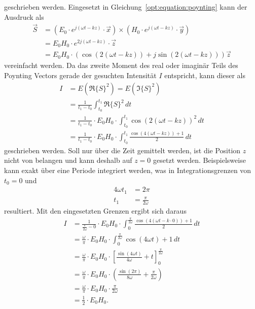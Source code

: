 geschrieben werden.
Eingesetzt in Gleichung~\ref{opt:equation:poynting} kann der Ausdruck als
\begin{align}
\vec{S}
&=
\left(E_0 \cdot e^{j(\omega t-k z)} \cdot \vec{x}\right) \times \left(H_0 \cdot e^{j(\omega t-k z)} \cdot \vec{y}\right)
\\
&=
E_0 H_0 \cdot e^{2j(\omega t-k z)} \cdot \vec{z}
\\
&=
E_0 H_0 \cdot \left(\cos{(2(\omega t-kz))}+j\sin{(2(\omega t-kz))}\right) \vec{z}
\end{align}
vereinfacht werden.
Da das zweite Moment des real oder imaginär Teils des Poynting Vectors gerade der gesuchten Intensität $I$ entspricht, kann dieser als 
\begin{align}
I
&=
E(\Re\{S\}^2)
=
E(\Im\{S\}^2)
\\
&=
\frac{1}{t_1- t_0} \int_{t_0}^{t_1} \Re\{S\}^2 \,dt
\\
&=
\frac{1}{t_1 - t_0} \cdot E_0 H_0 \cdot \int_{t_0}^{t_1}\cos\left({2(\omega t-kz)}\right)^2 \,dt
\\
&=
\frac{1}{t_1 - t_0} \cdot E_0 H_0 \cdot \int_{t_0}^{t_1}\frac{\cos(4(\omega t-kz)) + 1}{2} \,dt
\end{align}
geschrieben werden.
Soll nur über die Zeit gemittelt werden, ist die Position $z$ nicht von belangen und kann deshalb auf $z=0$ gesetzt werden.
Beispielsweise kann exakt über eine Periode integriert werden, was in Integrationsgrenzen von $t_0=0$ und
\begin{align}
4\omega t_1
&=
2\pi
\\
t_1
&=
\frac{\pi}{2\omega}
\end{align}
resultiert.
Mit den eingesetzten Grenzen ergibt sich daraus
\begin{align}
I
&=
\frac{1}{\frac{\pi}{2\omega} - 0} \cdot E_0 H_0 \cdot \int_{0}^{\frac{\pi}{2\omega}}\frac{\cos(4(\omega t-k\cdot0)) + 1}{2} \,dt
\\
&=
\frac{\omega}{\pi} \cdot E_0 H_0 \cdot \int_{0}^{\frac{\pi}{2\omega}}\cos(4\omega t) + 1 \,dt
\\
&=
\frac{\omega}{\pi} \cdot E_0 H_0 \cdot \left[\frac{\sin(4\omega t)}{4\omega} + t \right]_{0}^{\frac{\pi}{2\omega}}
\\
&=
\frac{\omega}{\pi} \cdot E_0 H_0 \cdot \left(\frac{\sin(2\pi)}{8\omega} + \frac{\pi}{2\omega}\right)
\\
&=
\frac{\omega}{\pi} \cdot E_0 H_0 \cdot \frac{\pi}{2\omega}
\\
&=
\frac{1}{2} \cdot E_0 H_0
.
\end{align}
